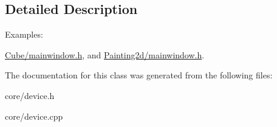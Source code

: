 \subsection{Detailed Description}
\begin{Desc}
\item[Examples\+: ]\par
\hyperlink{_cube_2mainwindow_8h-example}{Cube/mainwindow.\+h}, and \hyperlink{_painting2d_2mainwindow_8h-example}{Painting2d/mainwindow.\+h}.\end{Desc}


The documentation for this class was generated from the following files\+:\begin{DoxyCompactItemize}
\item 
core/device.\+h\item 
core/device.\+cpp\end{DoxyCompactItemize}
